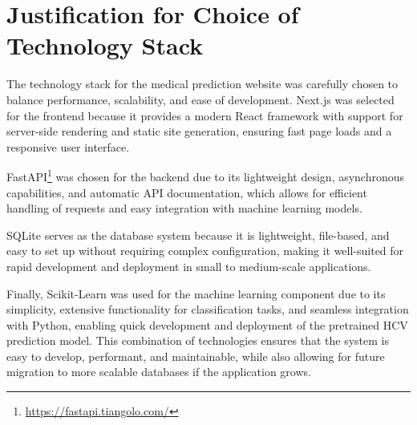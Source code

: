 \section*{Justification for Choice of Technology Stack}

The technology stack for the medical prediction website was carefully chosen to
balance performance, scalability, and ease of development. Next.js was selected
for the frontend because it provides a modern React framework with support
for server-side rendering and static site generation, ensuring fast page loads
and a responsive user interface.

FastAPI\footnote{\url{https://fastapi.tiangolo.com/}} was chosen for the backend due to
its lightweight design, asynchronous capabilities, and automatic API documentation,
which allows for efficient handling of requests and easy integration with machine learning models.

SQLite serves as the database system because it is lightweight, file-based, and easy to set up without
requiring complex configuration, making it well-suited for rapid development and deployment in small to medium-scale applications.

Finally, Scikit-Learn was used for the machine learning component due to its simplicity,
extensive functionality for classification tasks, and seamless integration with Python,
enabling quick development and deployment of the pretrained HCV prediction model.
This combination of technologies ensures that the system is easy to develop, performant,
and maintainable, while also allowing for future migration to more scalable databases if the application grows.

